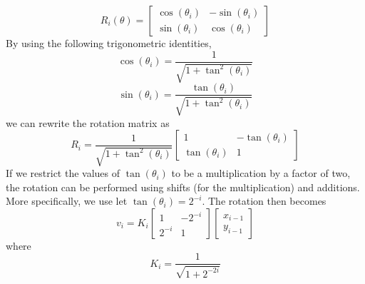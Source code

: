 \begin{equation}
R_{i}(\theta) = \begin{bmatrix} \cos(\theta_{i}) & -\sin(\theta_{i}) \\ \sin(\theta_{i}) & \cos(\theta_{i})\end{bmatrix}
\end{equation}
By using the following trigonometric identities,
\begin{equation}
\cos(\theta_{i}) =  {\frac{1}{\sqrt{1 + \tan^2(\theta_{i})}}}
\end{equation}
\begin{equation}
\sin(\theta_{i})  =  \frac{\tan(\theta_{i})}{\sqrt{1 + \tan^2(\theta_{i})}}
\end{equation}
we can rewrite the rotation matrix as
\begin{equation}
R_i = \frac{1}{\sqrt{1 + \tan^2(\theta_i)}} \begin{bmatrix} 1 & -\tan(\theta_i) \\ \tan(\theta_i) & 1 \end{bmatrix}
\end{equation}
If we restrict the values of $\tan(\theta_i)$ to be a multiplication by a factor of two, the rotation can be performed using shifts (for the multiplication) and additions. More specifically, we use let $\tan(\theta_i) = 2^{-i}$. The rotation then becomes 
\begin{equation}
v_i = K_i \begin{bmatrix} 1 & - 2^{-i} \\  2^{-i} & 1 \end{bmatrix} \begin{bmatrix} x_{i-1} \\ y_{i-1} \end{bmatrix}
\end{equation}
where
\begin{equation}
K_i = \frac{1}{\sqrt{1 + 2^{-2i}}}
\end{equation}

